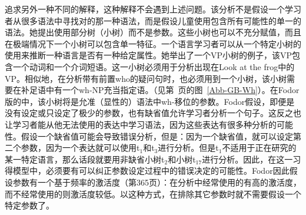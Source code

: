 \citet[]{Fodor98a}追求另外一种不同的解释，这种解释不会遇到上述问题。该分析不是假设一个学习者从很多语法中寻找对的那一种语法，而是假设儿童使用包含所有可能性的单一的语法。她提出使用部分树（小树）而不是参数。这些小树也可以不充分赋值，而且在极端情况下一个小树可以包含单一特征\citep[]{Fodor98b}。一个语言学习者可以从一个特定小树的使用来推断一种语言是否有一种给定属性。她举出了一个VP小树的例子，该VP包含一个动词和一个介词短语。这一小树必须用于分析出现在Look at the frog中的VP。相似地，在分析带有前置who的疑问句时，也必须用到一个小树，该小树需要在补足语中有一个wh-NP充当指定语。（见第~\pageref{Abb-GB-Wh}页的图~\ref{Abb-GB-Wh}）。在Fodor版的\pptc 中，该小树将是允准（显性的）语法中wh-移位的参数。Fodor假设，即便是没有设定或只设定了极少的参数，也有缺省值允许学习者分析一个句子。这反之也让学习者能从他无法使用的表达中学习语法，因为这些表达有很多种分析的可能性。假设一个缺省值可能会导致错误分析，但是：因为一个缺省值，就可以设定第二个参数，因为一个表达就可以使用t$_1$和t$_3$进行分析。但是t$_1$不适用于正在研究的某一特定语言，那么话段就要用非缺省小树t$_2$和小树t$_{17}$进行分析。因此，在这一习得模型中，必须要有可以纠正参数设定过程中的错误决定的可能性。Fodor因此假设参数有一个基于频率的激活度（第365页）：在分析中经常使用的有高的激活度，而不经常使用的则激活度较低。以这种方式，在排除其它参数时就不需要假设一个特定参数了。
